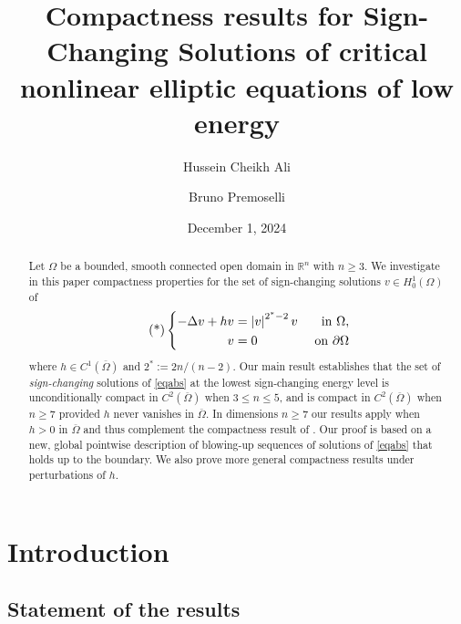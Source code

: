 \documentclass[10pt]{amsart}
\title[]{Compactness results for Sign-Changing Solutions of critical nonlinear elliptic equations of low energy }
\author{Hussein Cheikh Ali}
\author{Bruno Premoselli}
\date{December 1, 2024}
\numberwithin{equation}{section}
\newcommand{\Om}{\Omega}
\def \rr {\mathbb{R}}
\theoremstyle{plain}
\theoremstyle{remark}
\begin{document}
	\begin{abstract}
Let $\Om$ be a bounded, smooth connected open domain in $\rr^n$ with $n\geq 3$. We investigate in this paper compactness properties for the set of sign-changing solutions $v \in H^1_0(\Om)$ of
		\begin{equation}\label{eqabs} \tag{*}
			\left\{\begin{aligned}
						-\Delta v+h v& =\left|v\right|^{2^*-2}v &\hbox{ in } \Omega, \\
			v& = 0  &\hbox{ on } \partial \Omega
		\end{aligned}\right.
	\end{equation}
where $h\in C^1(\overline{\Om})$ and $2^*:=2n/(n-2)$. Our main result establishes that the set of \emph{sign-changing} solutions of \eqref{eqabs} at the lowest sign-changing energy level is unconditionally compact in $C^2(\overline{\Om})$ when $3 \le n \le 5$, and is compact in $C^2(\overline{\Om})$ when $n \ge 7$ provided $h$ never vanishes in $\overline{\Om}$. In dimensions $n \ge 7$ our results apply when $h >0$ in $\overline{\Om}$ and thus complement the compactness result of \cite{DevillanovaSolimini}. Our proof is based on a new, global pointwise description of blowing-up sequences of solutions of \eqref{eqabs} that holds up to the boundary. We also prove more general compactness results under perturbations of $h$.
	\end{abstract}
	\maketitle
	\section{Introduction}
		
\subsection{Statement of the results}
\end{document}
